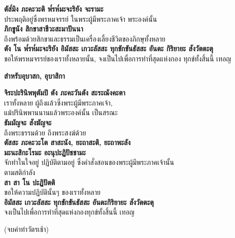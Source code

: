 \documentclass[12pt]{article}
\begin{document}
\textbf{ตัส๎มิง ภะคะวะติ พ๎รห๎มะจะริยัง จะรามะ\\}
\indent ประพฤติอยู่ซึ่งพรหมจรรย์ ในพระผู้มีพระภาคเจ้า พระองค์นั้น\\
\textbf{ภิกขูนัง สิกขาสาชีวะสะมาปันนา\\}
\indent ถึงพร้อมด้วยสิกขาและธรรมเป็นเครื่องเลี้ยงชีวิตของภิกษุทั้งหลาย\\
\textbf{ตัง โน พ๎รห๎มะจะริยัง อิมัสสะ เกวะลัสสะ ทุกขักขันธัสสะ อันตะ กิริยายะ สังวัตตะตุ\\}
\indent ขอให้พรหมจรรย์ของเราทั้งหลายนั้น, จงเป็นไปเพื่อการทำที่สุดแห่งกอง ทุกข์ทั้งสิ้นนี้ เทอญ\\
\begin{center}\textbf{สำหรับอุบาสก, อุบาสิกา}\end{center}
\textbf{จิระปะรินิพพุตัมปิ ตัง ภะคะวันตัง สะระณังคะตา\\}
\indent เราทั้งหลาย ผู้ถึงแล้วซึ่งพระผู้มีพระภาคเจ้า,\\
\indent แม้ปรินิพพานนานแล้วพระองค์นั้น เป็นสรณะ\\
\textbf{ธัมมัญจะ สังฆัญจะ}\\
\indent ถึงพระธรรมด้วย ถึงพระสงฆ์ด้วย\\
\textbf{ตัสสะ ภะคะวะโต สาสะนัง, ยะถาสะติ, ยะถาพะลัง\\
มะนะสิกะโรมะ อะนุปะฏิปัชชามะ}\\
\indent จักทำในใจอยู่ ปฏิบัติตามอยู่ ซึ่งคำสั่งสอนของพระผู้มีพระภาคเจ้านั้น\\
\indent ตามสติกำลัง\\
\textbf{สา สา โน ปะฏิปัตติ}\\
\indent ขอให้ความปฏิบัตินั้นๆ ของเราทั้งหลาย\\
\textbf{อิมัสสะ เกวะลัสสะ ทุกขักขันธัสสะ อันตะกิริยายะ สังวัตตะตุ}\\
\indent จงเป็นไปเพื่อการทำที่สุดแห่งกองทุกข์ทั้งสิ้นนี้ เทอญ\\
\begin{center}
(จบคำทำวัตรเช้า)
\end{center}
\pagebreak
\end{document}
